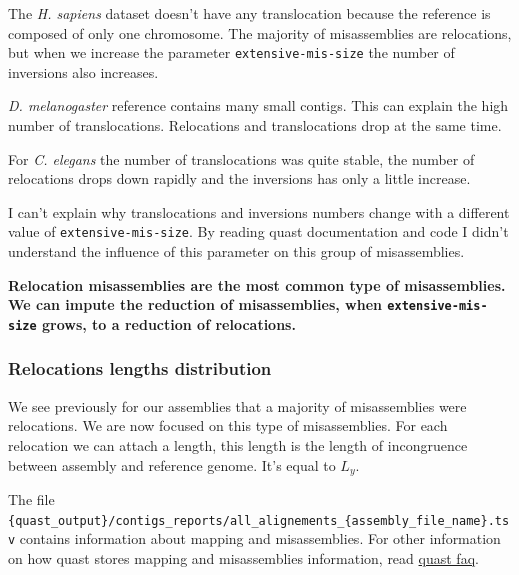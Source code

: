 \documentclass[./main.tex]{subfiles}
\begin{document}
The \emph{H. sapiens} dataset doesn't have any translocation because the
reference is composed of only one chromosome. The majority of
misassemblies are relocations, but when we increase the parameter
\texttt{extensive-mis-size} the number of inversions also increases.

\emph{D. melanogaster} reference contains many small contigs. This can
explain the high number of translocations. Relocations and
translocations drop at the same time.

For \emph{C. elegans} the number of translocations was quite stable, the
number of relocations drops down rapidly and the inversions has only a
little increase.

I can't explain why translocations and inversions numbers change with a
different value of \texttt{extensive-mis-size}. By reading quast
documentation and code I didn't understand the influence of this
parameter on this group of misassemblies.

\textbf{Relocation misassemblies are the most common type of
misassemblies. We can impute the reduction of misassemblies, when
\texttt{extensive-mis-size} grows, to a reduction of relocations.}

\subsubsection{Relocations lengths distribution}

We see previously for our assemblies that a majority of misassemblies
were relocations. We are now focused on this type of misassemblies. For
each relocation we can attach a length, this length is the length of
incongruence between assembly and reference genome. It's equal to
$L_y$.

The file
\texttt{\{quast\_output\}/contigs\_reports/all\_alignements\_\{assembly\_file\_name\}.tsv}
contains information about mapping and misassemblies. For other
information on how quast stores mapping and misassemblies information,
read \href{http://quast.bioinf.spbau.ru/manual.html\#sec7}{quast faq}.
\end{document}
